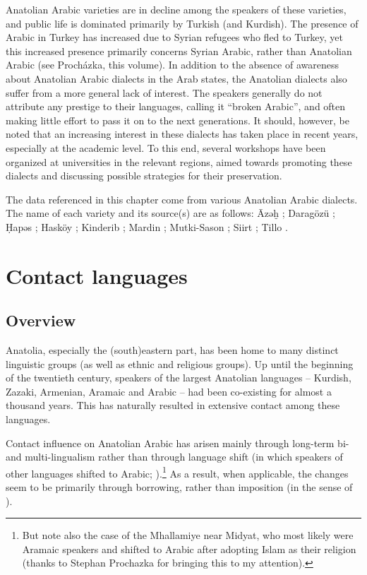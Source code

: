 \documentclass[output=paper]{langsci/langscibook}
\begin{document}
Anatolian Arabic varieties are in decline among the speakers of these varieties, and public life is dominated primarily by Turkish (and Kurdish). The presence of Arabic in Turkey has increased due to Syrian refugees who fled to Turkey, yet this increased presence primarily concerns Syrian Arabic, rather than Anatolian Arabic (see Proch\'{a}zka, this volume). In addition to the absence of awareness about Anatolian Arabic dialects in the Arab states, the Anatolian dialects also suffer from a more general lack of interest. The speakers generally do not attribute any prestige to their languages, calling it ``broken Arabic'', and often making little effort to pass it on to the next generations. It should, however, be noted that an increasing interest in these dialects has taken place in recent years, especially at the academic level. To this end, several workshops have been organized at universities in the relevant regions, aimed towards promoting these dialects and discussing possible strategies for their preservation.  

The data referenced in this chapter come from various Anatolian Arabic dialects. The name of each variety and its source(s) are as follows: \={A}zəḫ \citep{Wittrich2001}; Darag\"{o}z\"{u} \citep{Jastrow1973}; \d{H}apəs \citep{Talay2007}; Hask\"{o}y \citep{Talay2001,Talay2002}; Kinderib \citep{Jastrow1978};  Mardin  \citep{Jastrow2006,Grigore2007article,GrigoreBituna2012}; Mutki-Sason \citep{Akkus2016,Akkus2017,Isaksson2005}; Siirt \citep{Bituna2016,GrigoreBituna2012}; Tillo \citep{Lahdo2009}.

\section{Contact languages}

\subsection{Overview}
Anatolia, especially the (south)eastern part, has been home to many distinct linguistic groups (as well as ethnic and religious groups). Up until the beginning of the twentieth century, speakers of the largest Anatolian languages -- Kurdish, Zazaki, Armenian, Aramaic and Arabic -- had been co-existing for almost a thousand years. This has naturally resulted in extensive contact among these languages.  

Contact influence on Anatolian Arabic has arisen mainly through long-term bi- and multi-lingualism rather than through language shift (in which speakers of other languages shifted to Arabic; \citealt{Thomason2001}).\footnote{But note also the case of the Mhallamiye near Midyat, who most likely were Aramaic speakers and shifted to Arabic after adopting Islam as their religion (thanks to Stephan Prochazka for bringing this to my attention).} As a result, when applicable, the changes seem to be primarily through borrowing, rather than imposition (in the sense of \citealt{VanCoetsem1988,VanCoetsem2000}). 
\end{document}
